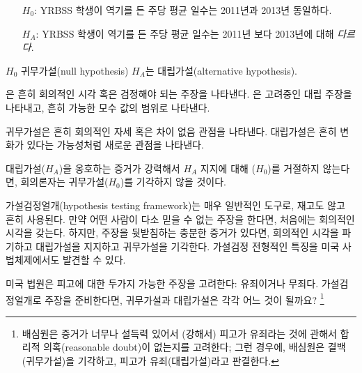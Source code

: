 \begin{itemize}
\setlength{\itemsep}{0mm}
\item[$H_0$:] YRBSS 학생이 역기를 든 주당 평균 일수는 2011년과 2013년 동일하다.
\item[$H_A$:] YRBSS 학생이 역기를 든 주당 평균 일수는 2011년 보다 2013년에 대해 \emph{다르다}.
\end{itemize}

$H_0$ 귀무가설(null hypothesis) $H_A$는 대립가설(alternative hypothesis).

\begin{termBox}{
{\small {}은 흔히 회의적인 시각 혹은 검정해야 되는 주장을 나타낸다. 은 고려중인 대립 주장을 나타내고, 흔히 가능한 모수 값의 범위로 나타낸다.}}
\end{termBox}

귀무가설은 흔히 회의적인 자세 혹은 차이 없음 관점을 나타낸다. 대립가설은 흔히 변화가 있다는 가능성처럼 새로운 관점을 나타낸다.

\begin{tipBox}{
대립가설($H_A$)을 옹호하는 증거가 강력해서 $H_A$ 지지에 대해 ($H_0$)를 거절하지 않는다면, 회의론자는 귀무가설($H_0$)를 기각하지 않을 것이다.}
\end{tipBox}

가설검정얼개(hypothesis testing framework)는 매우 일반적인 도구로, 재고도 않고 흔히 사용된다. 만약 어떤 사람이 다소 믿을 수 없는 주장을 한다면, 처음에는 회의적인 시각을 갖는다. 하지만, 주장을 뒷받침하는 충분한 증거가 있다면, 회의적인 시각을 파기하고 대립가설을 지지하고 귀무가설을 기각한다. 가설검정 전형적인 특징을 미국 사법체제에서도 발견할 수 있다.

\begin{exercise} \label{hypTestCourtExample}
미국 법원은 피고에 대한 두가지 가능한 주장을 고려한다: 유죄이거나 무죄다. 가설검정얼개로 주장을 준비한다면, 귀무가설과 대립가설은 각각 어느 것이 될까요? 
\footnote{배심원은 증거가 너무나 설득력 있어서 (강해서) 피고가 유죄라는 것에 관해서 합리적 의혹(reasonable doubt)이 없는지를 고려한다; 그런 경우에, 배심원은 결백(귀무가설)을 기각하고, 피고가 유죄(대립가설)라고 판결한다.}
\end{exercise}

